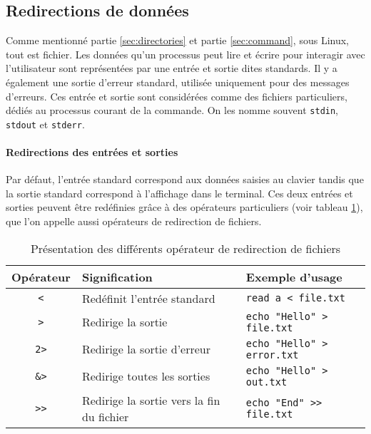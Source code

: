 \newpage

\subsection{Redirections de données} \label{sec:redirect}
Comme mentionné partie \ref{sec:directories} et partie \ref{sec:command}, sous Linux, tout est fichier. Les données qu'un processus peut lire et écrire pour interagir avec l’utilisateur sont représentées par une entrée et sortie dites standards. Il y a également une sortie d’erreur standard, utilisée uniquement pour des messages d’erreurs. Ces entrée et sortie sont considérées comme des fichiers particuliers, dédiés au processus courant de la commande. On les nomme souvent \texttt{stdin}, \texttt{stdout} et \texttt{stderr}.

\paragraph{Redirections des entrées et sorties}

Par défaut, l'entrée standard correspond aux données saisies au clavier tandis que la sortie standard correspond à l'affichage dans le terminal. Ces deux entrées et sorties peuvent être redéfinies grâce à des opérateurs particuliers (voir tableau \ref{tab:file_redirect}), que l'on appelle aussi opérateurs de redirection de fichiers.

\begin{table}[h!]
    \centering
    \begin{tabularx}{\textwidth}{| c | X | X |}
        \hline
        \textbf{Opérateur}  &  \textbf{Signification}                     & \textbf{Exemple d'usage}                    \\
            \hline
        \texttt{<}          &  Redéfinit l'entrée standard                & \texttt{read a < file.txt}        \\
            \hline
        \texttt{>}          &  Redirige la sortie                         & \texttt{echo "Hello" > file.txt}  \\
            \hline
        \texttt{2>}         &  Redirige la sortie d'erreur                & \texttt{echo "Hello" > error.txt} \\
            \hline
        \texttt{\&>}        &  Redirige toutes les sorties                & \texttt{echo "Hello" > out.txt}   \\
            \hline
        \texttt{>{}>}       &  Redirige la sortie vers la fin du fichier  & \texttt{echo "End" >> file.txt}   \\
        \hline
    \end{tabularx}
    {\addtolength{\parskip}{-1cm}\caption{Présentation des différents opérateur de redirection de fichiers}\label{tab:file_redirect}}
\end{table}

